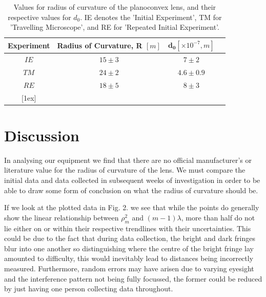 \documentclass[twocolumn]{revtex4}
\newcommand{\squeezeup}{\vspace{-2.5mm}}
\begin{document}
\begin{table}[h!]
\centering
\begin{tabular}{ |c|c|c|c| } 
 \hline
 \textbf{Experiment} & \textbf{Radius of Curvature, R $[m]$} & $\boldsymbol{d_0} [\times10^{-7}, m]$ \\ [0.5ex] 
 \hline\hline
 $IE$ &$15\pm3$ & $7\pm2$ \\ 
 $TM$ & $24\pm2$ & $4.6\pm0.9$ \\
 $RE$ & $18\pm5$ & $8\pm3$ \\
 [1ex] 
 
 \hline
\end{tabular}
\caption{Values for radius of curvature of the planoconvex lens, and their respective values for $d_0$. IE denotes the 'Initial Experiment', TM for 'Travelling Microscope', and RE for 'Repeated Initial Experiment'.}
\label{table:1}
\end{table}
\squeezeup
\squeezeup
\squeezeup

\vspace{-3ex}
\section{Discussion}
\vspace{-2ex}
In analysing our equipment we find that there are no official manufacturer's or literature value for the radius of curvature of the lens. We must compare the initial data and data collected in subsequent weeks of investigation in order to be able to draw some form of conclusion on what the radius of curvature should be. 

If we look at the plotted data in Fig. 2. we see that while the points do generally show the linear relationship between $\rho_m^2$ and $(m-1)\lambda$, more than half do not lie either on or within their respective trendlines with their uncertainties. This could be due to the fact that during data collection, the bright and dark fringes blur into one another so distinguishing where the centre of the bright fringe lay amounted to difficulty, this would inevitably lead to distances being incorrectly measured. Furthermore, random errors may have arisen due to varying eyesight and the interference pattern not being fully focussed, the former could be reduced by just having one person collecting data throughout. 
\end{document}
